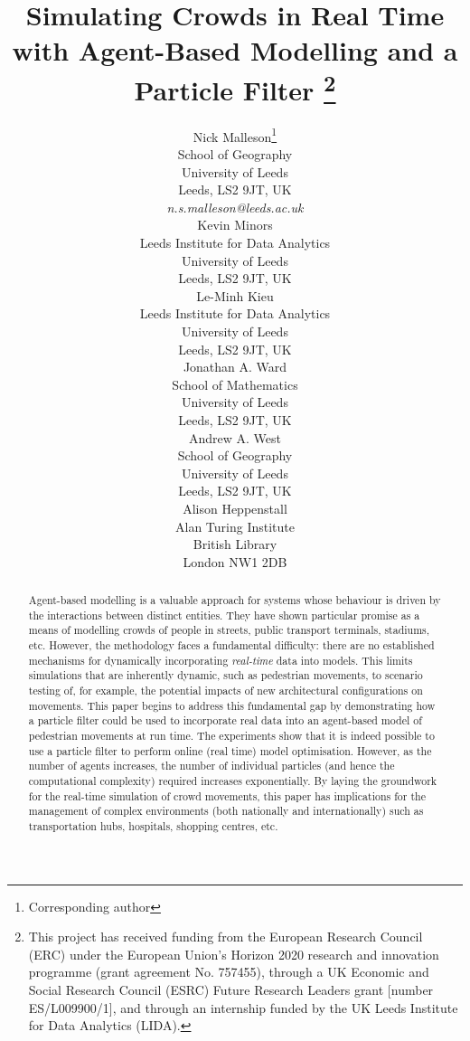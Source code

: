 \documentclass{article}
\title{Simulating Crowds in Real Time with Agent-Based Modelling and a Particle Filter
\thanks{This project has received funding from the European Research Council (ERC) under the European Union’s Horizon 2020 research and innovation programme (grant agreement No. 757455), through a UK Economic and Social Research Council (ESRC) Future Research Leaders grant [number ES/L009900/1], and through an internship funded by the UK Leeds Institute for Data Analytics (LIDA).}}
\author{
  Nick Malleson\thanks{Corresponding author}\\
  School of Geography\\
  University of Leeds\\
  Leeds, LS2 9JT, UK\\
  \textit{n.s.malleson@leeds.ac.uk}\\
 \And 
 Kevin Minors\\
  Leeds Institute for Data Analytics\\
  University of Leeds\\
  Leeds, LS2 9JT, UK \\
   \And 
 Le-Minh Kieu\\
  Leeds Institute for Data Analytics\\
  University of Leeds\\
  Leeds, LS2 9JT, UK \\
   \And 
 Jonathan A. Ward\\
  School of Mathematics\\
  University of Leeds\\
  Leeds, LS2 9JT, UK \\
   \And 
 Andrew A. West\\
  School of Geography\\
  University of Leeds\\
  Leeds, LS2 9JT, UK \\
   \And 
 Alison Heppenstall\\
  Alan Turing Institute\\
  British Library\\
  London NW1 2DB \\
 }
\begin{document}
\maketitle              %
%
\begin{abstract}
Agent-based modelling is a valuable approach for systems whose behaviour is driven by the interactions between distinct entities. They have shown particular promise as a means of modelling crowds of people in streets, public transport terminals, stadiums, etc. However, the methodology faces a fundamental difficulty: there are no established mechanisms for dynamically incorporating \textit{real-time} data into models. This limits simulations that are inherently dynamic, such as pedestrian movements, to scenario testing of, for example, the potential impacts of new architectural configurations on movements. This paper begins to address this fundamental gap by demonstrating how a particle filter could be used to incorporate real data into an agent-based model of pedestrian movements at run time. The experiments show that it is indeed possible to use a particle filter to perform online (real time) model optimisation.  However, as the number of agents increases, the number of individual particles (and hence the computational complexity) required increases exponentially. By laying the groundwork for the real-time simulation of crowd movements, this paper has implications for the management of complex environments (both nationally and internationally) such as transportation hubs, hospitals, shopping centres, etc.

\end{abstract}









%
%



\begin{appendices}
    
\end{appendices}
\end{document}

